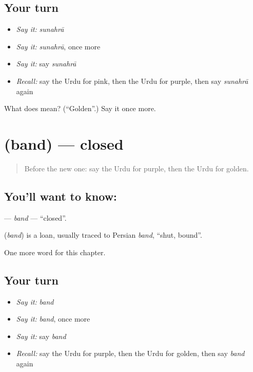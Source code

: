 \subsection*{Your turn}
\begin{itemize}
\raggedright
  \item \emph{Say it:} \emph{sunahrā}
  \item \emph{Say it:} \emph{sunahrā}, once more
  \item \emph{Say it:} say \emph{sunahrā}
  \item \emph{Recall:} say the Urdu for pink, then the Urdu for purple, then say \emph{sunahrā} again
\end{itemize}

\begin{tcolorbox}[breakable,colback=teal!4,colframe=teal!35!black,title={Before you move on}]
What does  mean? (\textquotedblleft{}Golden\textquotedblright{}.) Say it once more.
\end{tcolorbox}
\section[\texorpdfstring{\ur{بند} (band)}{بند (band)}]{ (band) — closed}

\label{lesson:UR-C137-band}



\begin{quote}
Before the new one: say the Urdu for purple, then the Urdu for golden.
\end{quote}

\subsection*{You'll want to know: }
\textbf{} — \emph{band} — \textquotedblleft{}closed\textquotedblright{}.

\begin{cousinweb}
\textbf{} (\emph{band}) is a loan, usually traced to Persian \emph{band}, \textquotedblleft{}shut, bound\textquotedblright{}.
\end{cousinweb}

\begin{grammarlens}[title={What you've built}]
One more word for this chapter.
\end{grammarlens}

\subsection*{Your turn}
\begin{itemize}
\raggedright
  \item \emph{Say it:} \emph{band}
  \item \emph{Say it:} \emph{band}, once more
  \item \emph{Say it:} say \emph{band}
  \item \emph{Recall:} say the Urdu for purple, then the Urdu for golden, then say \emph{band} again
\end{itemize}

